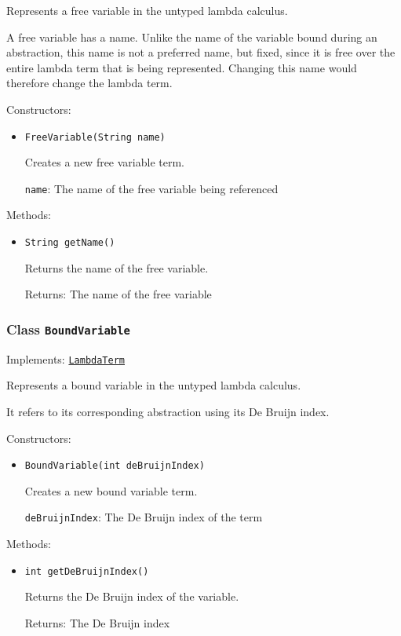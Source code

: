Represents a free variable in the untyped lambda calculus.
 
 A free variable has a name. Unlike the name of the variable
 bound during an abstraction, this name is not a preferred name,
 but fixed, since it is free over the entire lambda term that
 is being represented. Changing this name would therefore
 change the lambda term.

Constructors:
\begin{itemize}
\item \texttt{FreeVariable(String name)}

Creates a new free variable term.

\texttt{name}: The name of the free variable being referenced

\end{itemize}

Methods:
\begin{itemize}
\item \texttt{String getName()}

Returns the name of the free variable.

Returns: The name of the free variable

\end{itemize}

\subsubsection{Class \texttt{BoundVariable}}
\label{type:edu.kit.wavelength.client.model.term.BoundVariable}
Implements: \texttt{\hyperref[type:edu.kit.wavelength.client.model.term.LambdaTerm]{LambdaTerm}}

Represents a bound variable in the untyped lambda calculus.
 
 It refers to its corresponding abstraction using its
 De Bruijn index.

Constructors:
\begin{itemize}
\item \texttt{BoundVariable(int deBruijnIndex)}

Creates a new bound variable term.

\texttt{deBruijnIndex}: The De Bruijn index of the term

\end{itemize}

Methods:
\begin{itemize}
\item \texttt{int getDeBruijnIndex()}

Returns the De Bruijn index of the variable.

Returns: The De Bruijn index

\end{itemize}

